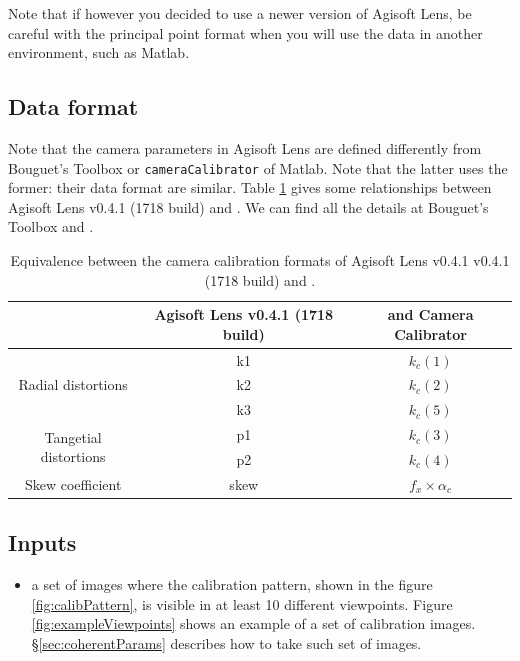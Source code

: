 \documentclass[11pt]{article}
\begin{document}
Note that if however you decided to use a newer version of Agisoft Lens, be careful with the principal point format when you will use the data in another environment, such as Matlab.

\subsection{Data format}
Note that the camera parameters in Agisoft Lens are defined differently from Bouguet's Toolbox \cite{bouguetToolbox} or {\tt cameraCalibrator} \cite{cameraCalibrator} of Matlab.
Note that the latter uses the former: their data format are similar.
Table \ref{tab:equivalence} gives some relationships between Agisoft Lens v0.4.1 (1718 build) and \cite{bouguetToolbox}.
We can find all the details at Bouguet's Toolbox \cite{lensCamDescription} and \cite{bouguetToolbox}.

\begin{table}[h]
\center
\begin{tabular}{|c|c|c|}
    \hline
    & Agisoft Lens v0.4.1 (1718 build) & \cite{bouguetToolbox} and Camera Calibrator \cite{cameraCalibrator} \\
    \hline
    \multirow{3}{*}{Radial distortions} & k1 & $k_c(1)$\\ \cline{2-3}
     & k2 & $k_c(2)$\\ \cline{2-3}
     & k3 & $k_c(5)$\\ \cline{2-3}
    \hline
    \multirow{2}{*}{Tangetial distortions} & p1 & $k_c(3)$\\ \cline{2-3}
     & p2 & $k_c(4)$\\ \cline{2-3}
    \hline
    Skew coefficient & skew & $f_x \times \alpha_c$\\
    \hline
\end{tabular}
\caption{Equivalence between the camera calibration formats of Agisoft Lens v0.4.1 v0.4.1 (1718 build) and \cite{bouguetToolbox}.}
\label{tab:equivalence}
\end{table}


\subsection{Inputs}
\begin{itemize}
\item a set of images where the calibration pattern, shown in the figure \ref{fig:calibPattern}, is visible in at least 10 different viewpoints.
Figure \ref{fig:exampleViewpoints} shows an example of a set of calibration images.
\S\ref{sec:coherentParams} describes how to take such set of images.
\end{itemize}
\end{document}
